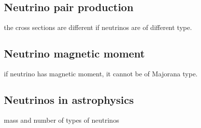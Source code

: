 \subsection{Neutrino pair production}
\label{sec:pair}
the cross sections are different if neutrinos are of different type.

\subsection{Neutrino magnetic moment}
\label{sec:mag}
if neutrino has magnetic moment, it cannot be of Majorana type.

\subsection{Neutrinos in astrophysics}
\label{sec:astro}
mass and number of types of neutrinos



